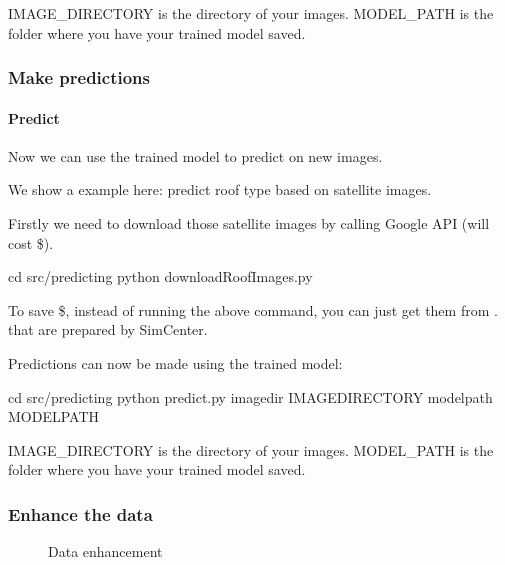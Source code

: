 \documentclass[letterpaper,10pt,english]{sphinxmanual}
\let\sphinxpxdimen\pdfpxdimen\else\newdimen\sphinxpxdimen
\begin{document}
\sphinxAtStartPar
IMAGE\_DIRECTORY is the directory of your images. MODEL\_PATH is the folder where you have your trained model saved.


\subsubsection{Make predictions}
\label{\detokenize{common/user_manual/predict:make-predictions}}\label{\detokenize{common/user_manual/predict:lbl-train}}\label{\detokenize{common/user_manual/predict::doc}}

\paragraph{Predict}
\label{\detokenize{common/user_manual/predict:predict}}
\sphinxAtStartPar
Now we can use the trained model to predict on new images.

\sphinxAtStartPar
We show a example here: predict roof type based on satellite images.

\sphinxAtStartPar
Firstly we need to download those satellite images by calling Google API (will cost \$).

\begin{sphinxVerbatim}[commandchars=\\\{\}]
cd src/predicting
python downloadRoofImages.py
\end{sphinxVerbatim}

\sphinxAtStartPar
To save \$, instead of running the above command, you can just get them from
. that are prepared by SimCenter.

\sphinxAtStartPar
Predictions can now be made using the trained model:

\begin{sphinxVerbatim}[commandchars=\\\{\}]
cd src/predicting
python predict.py \PYGZhy{}\PYGZhy{}image\PYGZus{}dir \PYGZlt{}IMAGE\PYGZus{}DIRECTORY\PYGZgt{} \PYGZhy{}\PYGZhy{}model\PYGZus{}path \PYGZlt{}MODEL\PYGZus{}PATH\PYGZgt{}
\end{sphinxVerbatim}

\sphinxAtStartPar
IMAGE\_DIRECTORY is the directory of your images. MODEL\_PATH is the folder where you have your trained model saved.


\subsubsection{Enhance the data}
\label{\detokenize{common/user_manual/enhance:enhance-the-data}}\label{\detokenize{common/user_manual/enhance:lbl-enhance}}\label{\detokenize{common/user_manual/enhance::doc}}
\begin{figure}[htbp]
\centering
\capstart

\noindent\sphinxincludegraphics[width=700\sphinxpxdimen]{{enhance}.gif}
\caption{Data enhancement}\label{\detokenize{common/user_manual/enhance:id1}}\end{figure}
\end{document}
